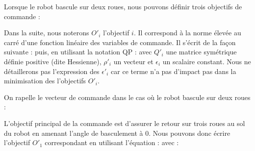 				Lorsque le robot bascule sur deux roues, nous pouvons définir trois objectifs de commande :
				
				Dans la suite, nous noterons $O'_i$ l'objectif $i$. Il correspond à la norme élevée au carré d'une fonction linéaire des variables de commande. Il s'écrit de la façon suivante :
				puis, en utilisant la notation QP :
				avec $Q'_i$ une matrice symétrique définie positive (dite Hessienne), $\rho'_i$ un vecteur et $\epsilon_i$ un scalaire constant.
				Nous ne détaillerons pas l'expression des $\epsilon'_i$ car ce terme n'a pas d'impact pas dans la minimisation des l'objectifs $O'_i$.
				
				On rapelle le vecteur de commande dans le cas où le robot bascule sur deux roues :
				
				
					L'objectif principal de la commande est d'assurer le retour sur trois roues au sol du robot en amenant l'angle de basculement à $0$.
					Nous pouvons donc écrire l'objectif $O'_1$ correspondant en utilisant l'équation  :
					avec :
				
